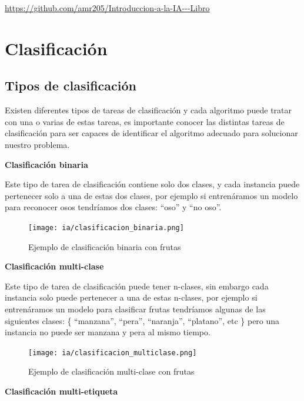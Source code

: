 \documentclass[11pt,fleqn]{book} %
\begin{document}
\url{https://github.com/amr205/Introduccion-a-la-IA---Libro}

\section{Clasificación} 

\subsection{Tipos de clasificación} 

Existen diferentes tipos de tareas de clasificación y cada algoritmo puede tratar con una o varias de estas tareas, es importante conocer las distintas tareas de clasificación para ser capaces de identificar el algoritmo adecuado para solucionar nuestro problema.

\textbf{Clasificación binaria}

Este tipo de tarea de clasificación contiene solo dos clases, y cada instancia puede pertenecer solo a una de estas dos clases, por ejemplo si entrenáramos un modelo para reconocer osos tendríamos dos clases: ``oso'' y ``no oso''.


\begin{figure}[ht]
\centering\texttt{[image: ia/clasificacion\_binaria.png]}
\caption{Ejemplo de clasificación binaria con frutas}

\label{fig:clasificacion_binaria} 
\end{figure}

\FloatBarrier

\textbf{Clasificación multi-clase}

Este tipo de tarea de clasificación puede tener n-clases, sin embargo cada instancia solo puede pertenecer a una de estas n-clases, por ejemplo si entrenáramos un modelo para clasificar frutas tendríamos algunas de las siguientes clases: \{ ``manzana'', ``pera'', ``naranja'', ``platano'', etc \} pero una instancia no puede ser manzana y pera al mismo tiempo.

\begin{figure}[ht]
\centering\texttt{[image: ia/clasificacion\_multiclase.png]}
\caption{Ejemplo de clasificación multi-clase con frutas}

\label{fig:clasificacion_multiclase} 
\end{figure}

\FloatBarrier

\textbf{Clasificación multi-etiqueta}
\end{document}
